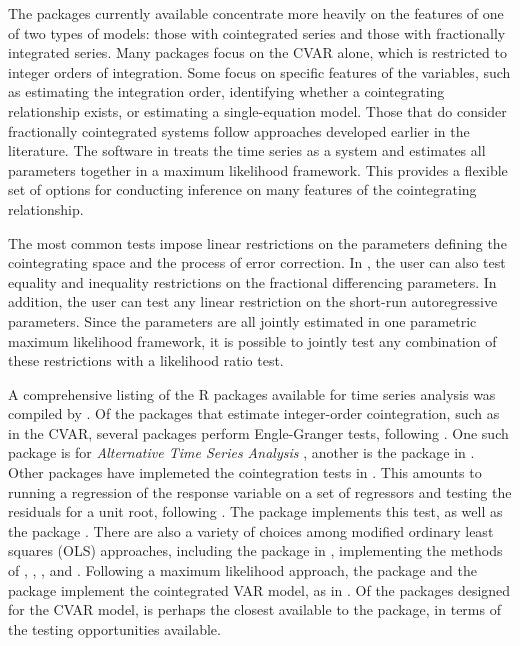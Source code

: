 \documentclass[article]{jss}
\begin{document}
The packages currently available concentrate more heavily on the features of one of two types of models:
those with cointegrated series and those with fractionally integrated series. 
% 
Many packages focus on the CVAR alone, which is restricted to integer orders of integration. Some focus on specific features of the variables, such as estimating the integration order, identifying whether a  cointegrating relationship exists, or estimating a single-equation model. 
Those that do consider fractionally cointegrated systems follow approaches developed earlier in the literature. 
The software in  treats the time series as a system and estimates all parameters together in a maximum likelihood framework. 
This provides a flexible set of options for conducting inference on many features of the cointegrating relationship. 

The most common tests impose linear restrictions on the parameters defining the cointegrating space and the process of error correction. 
In , the user can also test equality and inequality restrictions on the fractional differencing parameters. 
In addition, the user can test any linear restriction 
on the short-run autoregressive parameters. 
Since the parameters are all jointly estimated in one parametric maximum likelihood framework, 
it is possible to jointly test any combination of these restrictions with a likelihood ratio test. 



A comprehensive listing of the R packages \citep{R} available for time series analysis was compiled by 
\citet{Hyndman2020}.
% 
Of the packages that estimate integer-order cointegration, such as in the CVAR, several packages perform Engle-Granger tests, following \citet{EngleGranger1987}. 
One such package is  for \emph{Alternative Time Series Analysis} \citep{aTSA2015}, 
% 
another is the  package in \citep{egcm2017}. 
% 
Other packages have implemeted the cointegration tests in \citet{PhillipsOuliaris1990}. 
This amounts to running a regression of the response variable on a set of regressors and testing the residuals for a unit root, following \cite{PhillipsPerron1988}. 
The  package \citep{tseries2019} implements this test, 
as well as the  package \citep{urca2016}. 
% 
There are also a variety of choices among modified ordinary least squares (OLS) approaches, 
including the  package in \cite{cointReg2016}, implementing the methods of \citet{PhillipsHansen1990}, \citet{PhillipsLoretan1991}, \citet{Saikkonen1991}, and \citet{StockWatson1993}. 
% 
Following a maximum likelihood approach, 
the  package and the  package
implement the cointegrated VAR model, as in \citet{Johansen1995}. 
Of the packages designed for the CVAR model, 
 is perhaps the closest available to the  package, in terms of the testing opportunities available.
\end{document}
